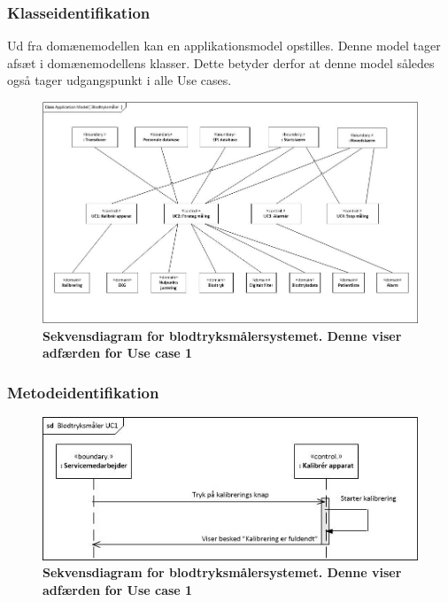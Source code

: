 \subsubsection{Klasseidentifikation}
Ud fra domænemodellen kan en applikationsmodel opstilles. Denne model tager afsæt i domænemodellens
klasser. Dette betyder derfor at denne model således også tager udgangspunkt i alle Use cases.
\begin{figure}[h!]
\includegraphics[width =1.0\textwidth , center]{billeder/appModel}
\caption{\textbf{Sekvensdiagram for blodtryksmålersystemet. Denne viser adfærden for Use case 1 }}
\end{figure}
\subsubsection{Metodeidentifikation}
\begin{figure}[h!]
\includegraphics[width =1.0\textwidth , center]{billeder/sdUC1}
\caption{\textbf{Sekvensdiagram for blodtryksmålersystemet. Denne viser adfærden for Use case 1 }}
\end{figure}


